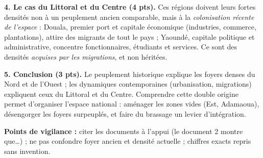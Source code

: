 \documentclass[11pt]{article}
\begin{document}
\begin{corrige}
\textbf{4. Le cas du Littoral et du Centre (4 pts).} Ces régions doivent leurs fortes densités non à un peuplement ancien comparable, mais à la \emph{colonisation récente de l'espace} : Douala, premier port et capitale économique (industries, commerce, plantations), attire des migrants de tout le pays ; Yaoundé, capitale politique et administrative, concentre fonctionnaires, étudiants et services. Ce sont des densités \emph{acquises par les migrations}, et non héritées.

\textbf{5. Conclusion (3 pts).} Le peuplement historique explique les foyers denses du Nord et de l'Ouest ; les dynamiques contemporaines (urbanisation, migrations) expliquent ceux du Littoral et du Centre. Comprendre cette double origine permet d'organiser l'espace national : aménager les zones vides (Est, Adamaoua), désengorger les foyers surpeuplés, et faire du brassage un levier d'intégration.

\textbf{Points de vigilance :} citer les documents à l'appui (\og le document 2 montre que\ldots\fg) ; ne pas confondre foyer ancien et densité actuelle ; chiffres exacts repris sans invention.
\end{corrige}
\end{document}

